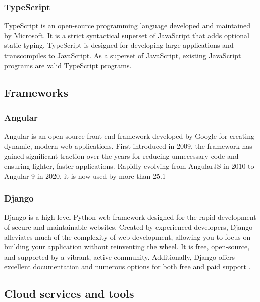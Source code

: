 \subsubsection{TypeScript}
TypeScript is an open-source programming language developed and maintained by Microsoft. It is a strict syntactical superset of JavaScript that adds optional static typing. TypeScript is designed for developing large applications and transcompiles to JavaScript. As a superset of JavaScript, existing JavaScript programs are valid TypeScript programs.\cite{typescript}

\subsection{Frameworks}
\subsubsection{Angular}

Angular is an open-source front-end framework developed by Google for creating dynamic, modern web applications. First introduced in 2009, the framework has gained significant traction over the years for reducing unnecessary code and ensuring lighter, faster applications. Rapidly evolving from AngularJS in 2010 to Angular 9 in 2020, it is now used by more than 25.1%

\subsubsection{Django}
Django is a high-level Python web framework designed for the rapid development of secure and maintainable websites. Created by experienced developers, Django alleviates much of the complexity of web development, allowing you to focus on building your application without reinventing the wheel. It is free, open-source, and supported by a vibrant, active community. Additionally, Django offers excellent documentation and numerous options for both free and paid support \cite{django}.


\subsection{Cloud services and tools}
